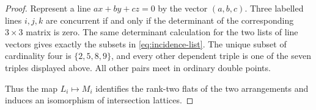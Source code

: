 \documentclass[10pt,a4paper]{amsart}
\begin{document}
\begin{proof}
Represent a line \(a x+b y+c z=0\) by the vector \((a,b,c)\).  Three labelled lines \(i,j,k\) are concurrent if and only if the determinant of the corresponding \(3\times3\) matrix is zero.  The same determinant calculation for the two lists of line vectors gives exactly the subsets in \eqref{eq:incidence-list}.  The unique subset of cardinality four is \(\{2,5,8,9\}\), and every other dependent triple is one of the seven triples displayed above.  All other pairs meet in ordinary double points.

Thus the map \(L_i\mapsto M_i\) identifies the rank-two flats of the two arrangements and induces an isomorphism of intersection lattices.
\end{proof}
\end{document}
